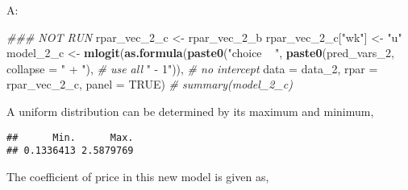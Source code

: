 \documentclass[
]{article}
\newenvironment{Shaded}{\begin{snugshade}}{\end{snugshade}}
\newcommand{\CommentTok}[1]{\textcolor[rgb]{0.56,0.35,0.01}{\textit{#1}}}
\newcommand{\DataTypeTok}[1]{\textcolor[rgb]{0.13,0.29,0.53}{#1}}
\newcommand{\DecValTok}[1]{\textcolor[rgb]{0.00,0.00,0.81}{#1}}
\newcommand{\KeywordTok}[1]{\textcolor[rgb]{0.13,0.29,0.53}{\textbf{#1}}}
\newcommand{\NormalTok}[1]{#1}
\newcommand{\OperatorTok}[1]{\textcolor[rgb]{0.81,0.36,0.00}{\textbf{#1}}}
\newcommand{\OtherTok}[1]{\textcolor[rgb]{0.56,0.35,0.01}{#1}}
\newcommand{\StringTok}[1]{\textcolor[rgb]{0.31,0.60,0.02}{#1}}
\begin{document}

A:

\begin{Shaded}
\begin{Highlighting}[]
\CommentTok{### NOT RUN}
\NormalTok{rpar_vec_}\DecValTok{2}\NormalTok{_c <-}\StringTok{ }\NormalTok{rpar_vec_}\DecValTok{2}\NormalTok{_b}
\NormalTok{rpar_vec_}\DecValTok{2}\NormalTok{_c[}\StringTok{"wk"}\NormalTok{] <-}\StringTok{ "u"}
\NormalTok{model_}\DecValTok{2}\NormalTok{_c <-}\StringTok{ }\KeywordTok{mlogit}\NormalTok{(}\KeywordTok{as.formula}\NormalTok{(}\KeywordTok{paste0}\NormalTok{(}\StringTok{"choice ~ "}\NormalTok{,}
                                      \KeywordTok{paste0}\NormalTok{(pred_vars_}\DecValTok{2}\NormalTok{,}
                                             \DataTypeTok{collapse =} \StringTok{" + "}\NormalTok{),  }\CommentTok{# use all}
                                      \StringTok{" - 1"}\NormalTok{)),  }\CommentTok{# no intercept}
                    \DataTypeTok{data =}\NormalTok{ data_}\DecValTok{2}\NormalTok{, }\DataTypeTok{rpar =}\NormalTok{ rpar_vec_}\DecValTok{2}\NormalTok{_c, }\DataTypeTok{panel =} \OtherTok{TRUE}\NormalTok{)}
\CommentTok{# summary(model_2_c)}
\end{Highlighting}
\end{Shaded}


A uniform distribution can be determined by its maximum and minimum,

\begin{Shaded}
\end{Shaded}

\begin{verbatim}
##      Min.      Max. 
## 0.1336413 2.5879769
\end{verbatim}


The coefficient of price in this new model is given as,

\begin{Shaded}
\end{Shaded}
\end{document}
